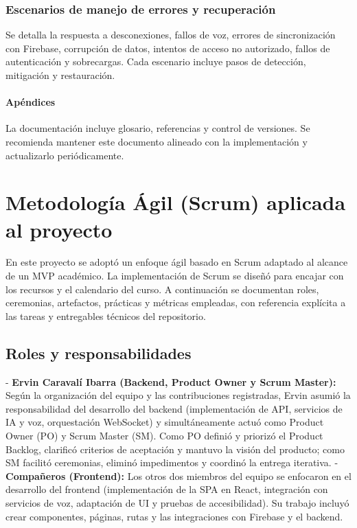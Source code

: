 \documentclass[12pt]{article}
\begin{document}
\subsubsection*{Escenarios de manejo de errores y recuperación}
Se detalla la respuesta a desconexiones, fallos de voz, errores de sincronización con Firebase, corrupción de datos, intentos de acceso no autorizado, fallos de autenticación y sobrecargas. Cada escenario incluye pasos de detección, mitigación y restauración.

\paragraph{Apéndices}
La documentación incluye glosario, referencias y control de versiones. Se recomienda mantener este documento alineado con la implementación y actualizarlo periódicamente.


\section{Metodología Ágil (Scrum) aplicada al proyecto}
En este proyecto se adoptó un enfoque ágil basado en Scrum adaptado al alcance de un MVP académico. La implementación de Scrum se diseñó para encajar con los recursos y el calendario del curso. A continuación se documentan roles, ceremonias, artefactos, prácticas y métricas empleadas, con referencia explícita a las tareas y entregables técnicos del repositorio.

\subsection{Roles y responsabilidades}
- \textbf{Ervin Caravalí Ibarra (Backend, Product Owner y Scrum Master):} Según la organización del equipo y las contribuciones registradas, Ervin asumió la responsabilidad del desarrollo del backend (implementación de API, servicios de IA y voz, orquestación WebSocket) y simultáneamente actuó como Product Owner (PO) y Scrum Master (SM). Como PO definió y priorizó el Product Backlog, clarificó criterios de aceptación y mantuvo la visión del producto; como SM facilitó ceremonias, eliminó impedimentos y coordinó la entrega iterativa.
- \textbf{Compañeros (Frontend):} Los otros dos miembros del equipo se enfocaron en el desarrollo del frontend (implementación de la SPA en React, integración con servicios de voz, adaptación de UI y pruebas de accesibilidad). Su trabajo incluyó crear componentes, páginas, rutas y las integraciones con Firebase y el backend.
\end{document}
